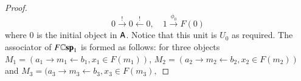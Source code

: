 \documentclass[reqno]{amsart}
\begin{document}
\begin{proof}
\begin{comment}
\[
\begin{tikzpicture}[scale=1.5]
\node (A) at (0,0) {$a_1$};
\node (B) at (1,0) {$m_1$};
\node (C) at (2,0) {$b_1$};
\node (D) at (1,-0.5) {$x_1 \in F(m_1)$};
\node (E) at (3,0) {$a_2$};
\node (F) at (4,0) {$m_2$};
\node (G) at (5,0) {$b_2$};
\node (H) at (4,-0.5) {$x_2 \in F(m_2)$};
\path[->,font=\scriptsize,>=angle 90]
(A) edge node[above]{$i_1$} (B)
(C) edge node[above]{$o_1$} (B)
(E) edge node[above]{$i_2$} (F)
(G) edge node[above]{$o_2$} (F);
\end{tikzpicture}
\]
their tensor product $M_1 \otimes M_2$ is given by taking the coproducts of the cospans in $\A$
\[
\begin{tikzpicture}[scale=1.5]
\node (A) at (0,0) {$a_1+a_2$};
\node (B) at (1.5,0) {$m_1+m_2$};
\node (C) at (3,0) {$b_1+b_2$};
\node (D) at (4.55,0) {$x_1+x_2 \in F(m_1+m_2)$};
\path[->,font=\scriptsize,>=angle 90]
(A) edge node[above]{$i_1+i_2$} (B)
(C) edge node[above]{$o_1+o_2$} (B);
\end{tikzpicture}
\]
where the decoration on the apex is obtained using the natural transformation of the symmetric lax monoidal pseudofunctor $F$: $$x_1+x_2 \mapseqq 1 \xrightarrow{\lambda^{-1}} 1 \times 1 \xrightarrow{x_1 \times x_2} F(m_1) \times F(m_2) \xrightarrow{\phi_{m_1,m_2}} F(m_1+m_2).$$
The monoidal unit $0_{F\lCsp_1}$ is given by:
\[
\begin{tikzpicture}[scale=1.5]
\node (A) at (0,0) {$0$};
\node (B) at (1,0) {$0$};
\node (C) at (2,0) {$0,$};
\node (D) at (3,0) {\bot_0 = \phi \in F(0)$};
\path[->,font=\scriptsize,>=angle 90]
(A) edge node[above]{$!$} (B)
(C) edge node[above]{$!$} (B);
\end{tikzpicture}
\]
\end{comment}
\begin{displaymath}
0\xrightarrow{!}0\xleftarrow{!}0,\quad 1\xrightarrow{\phi_0}F(0)
\end{displaymath}
where $0$ is the initial object in $\mathsf{A}$. Notice that this unit is $U_0$ as required. The associator of $F\mathbf{\mathbb Csp}_1$ is formed as follows: for three objects
$M_1=(a_1\to m_1\leftarrow b_1,x_1\in F(m_1))$, $M_2=(a_2\to m_2\leftarrow b_2,x_2\in F(m_2))$ and $M_3=(a_3\to m_3\leftarrow b_3,x_3\in F(m_3),$

\end{proof}
\end{document}
